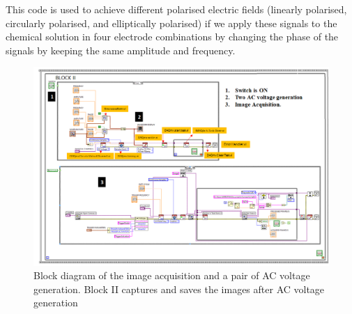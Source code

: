 \documentclass[journal=jacsat,manuscript=article]{achemso}
\begin{document}
This code is used to achieve different polarised electric fields (linearly polarised,
circularly polarised, and elliptically polarised) if we apply these signals to the chemical solution in four electrode combinations by changing the phase of the signals by keeping the same amplitude and frequency.
\begin{figure}[H]
	\centering
	\includegraphics[width=\linewidth, angle=90]{polarised_block_2.png}
	\caption{Block diagram of the image acquisition and a pair of AC voltage generation. Block II
		captures and saves the images after AC voltage generation}
	\label{fig:ex9}
\end{figure}
\end{document}
